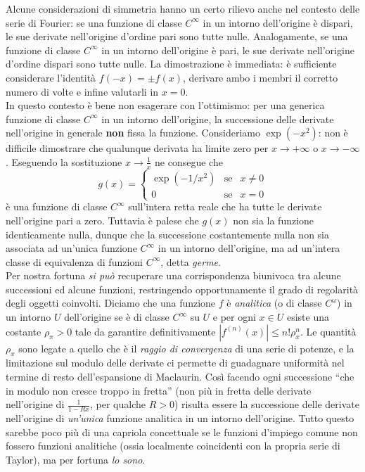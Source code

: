 \documentclass[a4paper,twoside]{article}
\theoremstyle{definition}
\numberwithin{theorem}{section}
\begin{document}
Alcune considerazioni di simmetria hanno un certo rilievo anche nel contesto delle serie di Fourier: se una funzione di classe $C^\infty$ in un intorno dell'origine è dispari, le sue derivate nell'origine d'ordine pari sono tutte nulle. Analogamente, se una funzione di classe $C^\infty$ in un intorno dell'origine è pari, le sue derivate nell'origine d'ordine dispari sono tutte nulle. La dimostrazione è immediata: è sufficiente considerare l'identità $f(-x)=\pm f(x)$, derivare ambo i membri il corretto numero di volte e infine valutarli in $x=0$.\\

In questo contesto è bene non esagerare con l'ottimismo: per una generica funzione di classe $C^{\infty}$ in un intorno dell'origine, la successione delle derivate nell'origine in generale \textbf{non} fissa la funzione. Consideriamo $\exp(-x^2)$: non è difficile dimostrare che qualunque derivata ha limite zero per $x\to +\infty$ o $x\to -\infty$. Eseguendo la sostituzione $x\to \frac{1}{x}$ ne consegue che 
$$ g(x) = \left\{\begin{array}{rcl}\exp(-1/x^2)&\text{se}&x\neq 0\\ 0 &\text{se}&x=0\end{array}\right. $$
è una funzione di classe $C^\infty$ sull'intera retta reale che ha tutte le derivate nell'origine pari a zero. Tuttavia è palese che $g(x)$ non sia la funzione identicamente nulla, dunque che la successione costantemente nulla non sia associata ad un'unica funzione $C^\infty$ in un intorno dell'origine, ma ad un'intera classe di equivalenza di funzioni $C^\infty$, detta \emph{germe}.\\

Per nostra fortuna \emph{si può} recuperare una corrispondenza biunivoca tra alcune successioni ed alcune funzioni, restringendo opportunamente il grado di regolarità degli oggetti coinvolti. Diciamo che una funzione $f$ è \emph{analitica} (o di classe $C^\omega$) in un intorno $U$ dell'origine se è di classe $C^\infty$ su $U$ e per ogni $x\in U$ esiste una costante $\rho_x > 0$ tale da garantire definitivamente $|f^{(n)}(x)|\leq n! \rho_x^n$. Le quantità $\rho_x$ sono legate a quello che è il \emph{raggio di convergenza} di una serie di potenze, e la limitazione sul modulo delle derivate ci permette di guadagnare uniformità nel termine di resto dell'espansione di Maclaurin. Così facendo ogni successione ``che in modulo non cresce troppo in fretta'' (non più in fretta delle derivate nell'origine di $\frac{1}{1-Rx}$, per qualche $R>0$) risulta essere la successione delle derivate nell'origine di \emph{un'unica} funzione analitica in un intorno dell'origine. Tutto questo sarebbe poco più di una capriola concettuale se le funzioni d'impiego comune non fossero funzioni analitiche (ossia localmente coincidenti con la propria serie di Taylor), ma per fortuna \emph{lo sono}.
\end{document}

